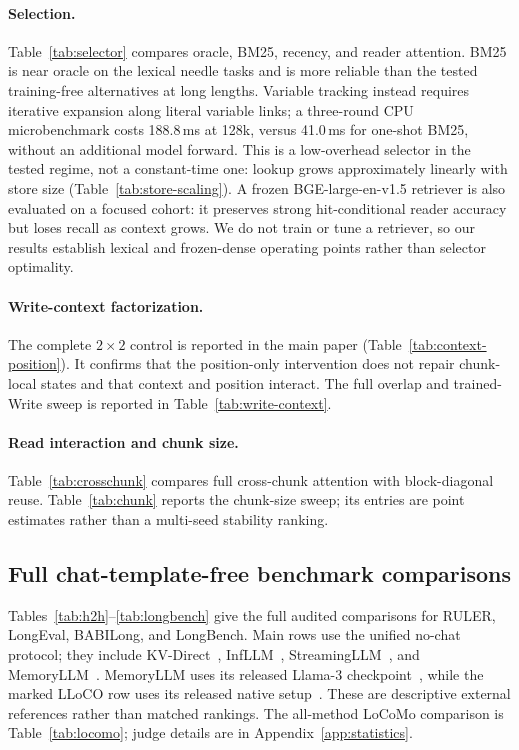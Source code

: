 \paragraph{Selection.}
Table~\ref{tab:selector} compares oracle, BM25, recency, and reader attention.
BM25 is near oracle on the lexical needle tasks and is more reliable than the
tested training-free alternatives at long lengths. Variable tracking instead
requires iterative expansion along literal variable links; a three-round CPU
microbenchmark costs 188.8\,ms at 128k, versus 41.0\,ms for one-shot BM25, without
an additional model forward. This is a low-overhead selector in the tested
regime, not a constant-time one: lookup grows approximately linearly with store
size (Table~\ref{tab:store-scaling}). A frozen BGE-large-en-v1.5 retriever is
also evaluated on a focused cohort: it preserves strong hit-conditional reader
accuracy but loses recall as context grows. We do not train or tune a retriever,
so our results establish lexical and frozen-dense operating points rather than
selector optimality.



\paragraph{Write-context factorization.}
The complete $2{\times}2$ control is reported in the main paper
(Table~\ref{tab:context-position}). It confirms that the position-only
intervention does not repair chunk-local states and that context and position
interact. The full overlap and trained-Write sweep is reported in
Table~\ref{tab:write-context}.



\paragraph{Read interaction and chunk size.}
Table~\ref{tab:crosschunk} compares full cross-chunk attention with
block-diagonal reuse. Table~\ref{tab:chunk} reports the chunk-size sweep; its
entries are point estimates rather than a multi-seed stability ranking.



\subsection{Full chat-template-free benchmark comparisons}
\label{app:tasks}
Tables~\ref{tab:h2h}--\ref{tab:longbench} give the full audited comparisons for
RULER, LongEval, BABILong, and LongBench. Main rows use the unified no-chat
protocol; they include KV-Direct~\citep{kvdirect}, InfLLM~\citep{infllm},
StreamingLLM~\citep{streamingllm}, and MemoryLLM~\citep{memoryllm}. MemoryLLM
uses its released Llama-3 checkpoint~\citep{llama3}, while the marked LLoCO
row uses its released native setup~\citep{lloco}. These are descriptive external
references rather than matched rankings.
The all-method LoCoMo comparison is Table~\ref{tab:locomo}; judge details are in
Appendix~\ref{app:statistics}.

